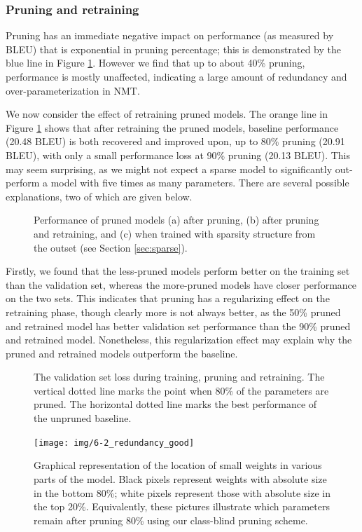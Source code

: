 \subsubsection{Pruning and retraining}
\label{subsec:effect}


Pruning has an immediate negative impact on performance (as measured by BLEU) that is exponential in pruning percentage; this is demonstrated by the blue line in Figure \ref{fig:main_results}.
However we find that up to about 40\% pruning, performance is mostly unaffected, indicating a large amount of redundancy and over-parameterization in NMT.

We now consider the effect of retraining pruned models.
The orange line in Figure \ref{fig:main_results} shows that after retraining the pruned models, baseline performance (20.48 BLEU) is both recovered and improved upon, up to 80\% pruning (20.91 BLEU), with only a small performance loss at 90\% pruning (20.13 BLEU).
This may seem surprising, as we might not expect a sparse model to significantly out-perform a model with five times as many parameters.
There are several possible explanations, two of which are given below.
\begin{figure}
\centering

\caption{Performance of pruned models (a) after pruning, (b) after pruning and retraining, and (c) when trained with sparsity structure from the outset (see Section \ref{sec:sparse}).}
\label{fig:main_results}
\end{figure}

Firstly, we found that the less-pruned models perform better on the training set than the validation set, whereas the more-pruned models have closer performance on the two sets. 
This indicates that pruning has a regularizing effect on the retraining phase, though clearly more is not always better, as the 50\% pruned and retrained model has better validation set performance than the 90\% pruned and retrained model.
Nonetheless, this regularization effect may explain why the pruned and retrained models outperform the baseline.
\begin{figure}[tbh]
\centering

\caption{The validation set loss during training, pruning and retraining. The vertical dotted line marks the point when 80\% of the parameters are pruned. The horizontal dotted line marks the best performance of the unpruned baseline.}
\label{fig:loss_curve}
\end{figure}

\begin{figure}
\centering
\texttt{[image: img/6-2\_redundancy\_good]}
\caption{Graphical representation of the location of small weights in various parts of the model. 
Black pixels represent weights with absolute size in the bottom 80\%; white pixels represent those with absolute size in the top 20\%.
Equivalently, these pictures illustrate which parameters remain after pruning 80\% using our class-blind pruning scheme.
}
\label{fig:redundancy_location}
\end{figure}



